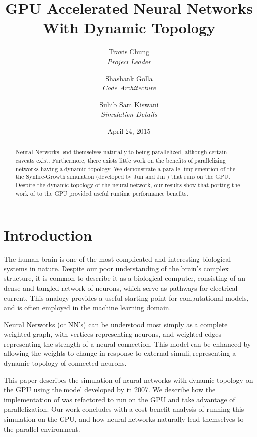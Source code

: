 \documentclass[a4paper]{article}
\title{GPU Accelerated Neural Networks With Dynamic Topology}
\author{Travis Chung\\ \emph{Project Leader}
    \and Shashank Golla\\ \emph{Code Architecture}
    \and Suhib Sam Kiswani\\\emph{Simulation Details}
}
\date{April 24, 2015}
\begin{document}
\maketitle

\listoftodos %

\begin{abstract}
Neural Networks lend themselves naturally to being parallelized, although certain caveats exist. Furthermore, there exists little work on the benefits of parallelizing networks having a dynamic topology. We demonstrate a parallel implemention of the the Synfire-Growth simulation (developed by Jun and Jin \cite{synfire}) that runs on the GPU. Despite the dynamic topology of the neural network, our results show that porting the work of \cite{synfire} to the GPU provided useful runtime performance benefits.
\end{abstract}

\section{Introduction}
The human brain is one of the most complicated and interesting biological systems in nature. Despite our poor understanding of the brain's complex structure, it is common to describe it as a biological computer, consisting of an dense and tangled network of neurons, which serve as pathways for electrical current. This analogy provides a useful starting point for computational models, and is often employed in the machine learning domain.

Neural Networks (or NN's) can be understood most simply as a complete weighted graph, with vertices representing neurons, and weighted edges representing the strength of a neural connection. This model can be enhanced by allowing the weights to change in response to external simuli, representing a dynamic topology of connected neurons.


This paper describes the simulation of neural networks with dynamic topology on the GPU using the model developed by \cite{synfire} in 2007. We describe how the implementation of \cite{synfire} was refactored to run on the GPU and take advantage of parallelization. Our work concludes with a cost-benefit analysis of running this simulation on the GPU, and how neural networks naturally lend themselves to the parallel environment.
\end{document}
